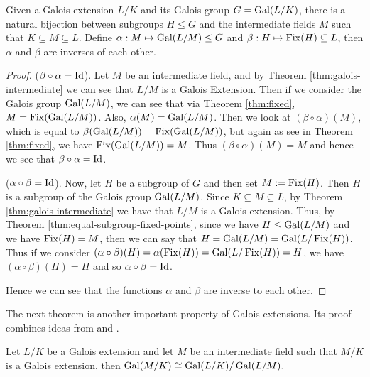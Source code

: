 \begin{theorem} \label{thm:fundamental-theorem} Given a Galois extension $L/K$ and its Galois group $G = \operatorname{Gal}(L/K)$, there is a natural bijection between subgroups $H\leq G$ and the intermediate fields $M$ such that $K \subseteq M \subseteq L$. Define
 $\alpha:M \mapsto \operatorname{Gal}(L/M) \leq G$ and
 $\beta:H \mapsto \operatorname{Fix}(H) \subseteq L$,
then $\alpha$ and $\beta$ are inverses of each other.
\end{theorem}
\begin{proof}

($\beta \circ \alpha = \operatorname{Id}$). Let $M$ be an intermediate field, and by Theorem \ref{thm:galois-intermediate} we can see that $L/M$ is a Galois Extension. Then if we consider the Galois group $\operatorname{Gal}(L/M)$, we can see that via Theorem \ref{thm:fixed}, $M = \operatorname{Fix}(\operatorname{Gal}(L/M))$. Also, $\alpha(M) = \operatorname{Gal}(L/M)$. Then we look at $(\beta \circ \alpha)(M)$, which is equal to $\beta(\operatorname{Gal}(L/M)) = \operatorname{Fix}(\operatorname{Gal}(L/M))$, but again as see in Theorem \ref{thm:fixed}, we have $\operatorname{Fix}(\operatorname{Gal}(L/M)) = M$. Thus $(\beta \circ \alpha)(M) = M$ and hence we see that $\beta \circ \alpha = \operatorname{Id}$.

($\alpha \circ \beta = \operatorname{Id}$). Now, let $H$ be a subgroup of $G$ and then set $M :=\operatorname{Fix}(H)$. Then $H$ is a subgroup of the Galois group $\operatorname{Gal}(L/M)$. Since $K \subseteq M \subseteq L$, by Theorem \ref{thm:galois-intermediate} we have that $L/M$ is a Galois extension. Thus, by Theorem \ref{thm:equal-subgroup-fixed-points}, since we have $H\leq \operatorname{Gal}(L/M)$ and we have $\operatorname{Fix}(H)=M$, then we can say that $H=\operatorname{Gal}(L/M)=\operatorname{Gal}(L/\operatorname{Fix}(H))$. Thus if we consider $(\alpha \circ \beta)(H) = \alpha(\operatorname{Fix}(H)) = \operatorname{Gal}(L/\operatorname{Fix}(H))= H $, we have $(\alpha \circ \beta)(H) = H$ and so $\alpha \circ \beta = \operatorname{Id}$.

Hence we can see that the functions $\alpha$ and $\beta$ are inverse to each other.
\end{proof}

The next theorem is another important property of Galois extensions. Its proof combines ideas from \cite[Chapter~12]{Stewart} and \cite[p.~58-62]{rotman_galois_1998}. 
\begin{theorem} \label{thm:correspondence-quotient}
    Let $L / K$ be a Galois extension and let $M$ be an intermediate field such that $M /K$ is a Galois extension, then 
    $\operatorname{Gal}(M / K) \cong \operatorname{Gal}(L / K) / \operatorname{Gal}(L / M). $
\end{theorem}

